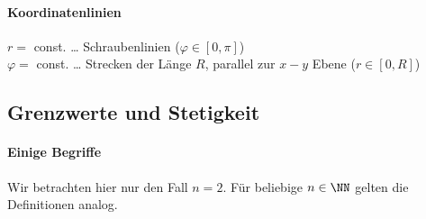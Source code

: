 \paragraph{Koordinatenlinien}\parskp
$r=$ const. … Schraubenlinien \quad ($\varphi \in [0,\pi]$)\\
$\varphi=$ const. … Strecken der Länge $R$, parallel zur $x-y$ Ebene \quad ($r\in [0,R]$)

\subsection{Grenzwerte und Stetigkeit}
\paragraph{Einige Begriffe}\parskp
Wir betrachten hier nur den Fall $n=2$. Für beliebige $n\in \NN$ gelten die Definitionen analog.
